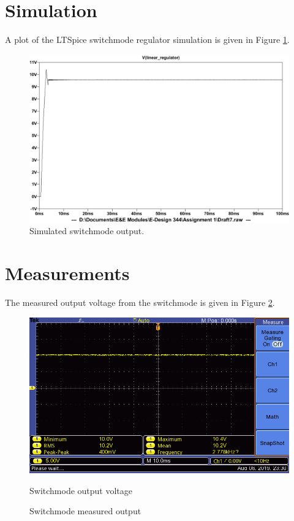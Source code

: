 \section{Simulation} \label{sec:simulation_switchmode}
A plot of the LTSpice switchmode regulator simulation is given in Figure \ref{fig:switchmode_simulation}.
\begin{figure}[h] 
 \centering
  	\includegraphics[width=0.7\linewidth]{./Figures/switchmode_simulate.pdf}
  	\caption{Simulated switchmode output.}
  	\label{fig:switchmode_simulation}
 \end{figure}
 
 
\section{Measurements} \label{sec:measurements_switchmode}
The measured output voltage from the switchmode is given in Figure \ref{fig:switchmode_measurement_box}.
\begin{figure}[h]
 \centering
        \includegraphics[width=0.6\linewidth,]{./Figures/switchmode_test}
        \caption{Switchmode output voltage}
\caption{Switchmode measured output}
\label{fig:switchmode_measurement_box}
\end{figure}







